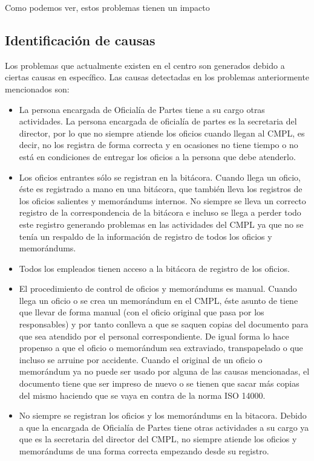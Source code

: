 Como podemos ver, estos problemas tienen un impacto
	\subsection{Identificación de causas}
	Los problemas que actualmente existen en el centro son generados debido a ciertas causas en específico. Las causas detectadas en los problemas anteriormente mencionados son:

\begin{itemize}
	
	\item La persona encargada de Oficialía de Partes tiene a su cargo otras actividades.
La persona encargada de oficialía de partes es la secretaria del director, por lo que no siempre atiende los oficios cuando llegan al CMPL, es decir, no los registra de forma correcta y en ocasiones no tiene tiempo o no está en condiciones de entregar los oficios a la persona que debe atenderlo.

	\item Los oficios entrantes sólo se registran en la bitácora.
Cuando llega un oficio, éste es registrado a mano en una bitácora, que también lleva los registros de los oficios salientes y memorándums internos. No siempre se lleva un correcto registro de la correspondencia de la bitácora e incluso se llega a perder todo este registro generando problemas en las actividades del CMPL ya que no se tenía un respaldo de la información de registro de todos los oficios y memorándums.
	\item Todos los empleados tienen acceso a la bitácora de registro de los oficios.
	
	\item El procedimiento de control de oficios y memorándums es manual.
Cuando llega un oficio o se crea un memorándum en el CMPL, éste asunto de tiene que llevar de forma manual (con el oficio original que pasa por los responsables) y por tanto conlleva a que se saquen copias del documento para que sea atendido por el personal correspondiente. De igual forma lo hace propenso a que el oficio o memorándum sea extraviado, transpapelado o que incluso se arruine por accidente. Cuando el original de un oficio o memorándum ya no puede ser usado por alguna de las causas mencionadas, el documento tiene que ser impreso de nuevo o se tienen que sacar más copias del mismo haciendo que se vaya en contra de la norma ISO 14000.

	\item No siempre se registran los oficios y los memorándums en la bitacora.
Debido a que la encargada de Oficialía de Partes tiene otras actividades a su cargo ya que es la secretaria del director del CMPL, no siempre atiende los oficios y memorándums de una forma correcta empezando desde su registro. 


\end{itemize}
